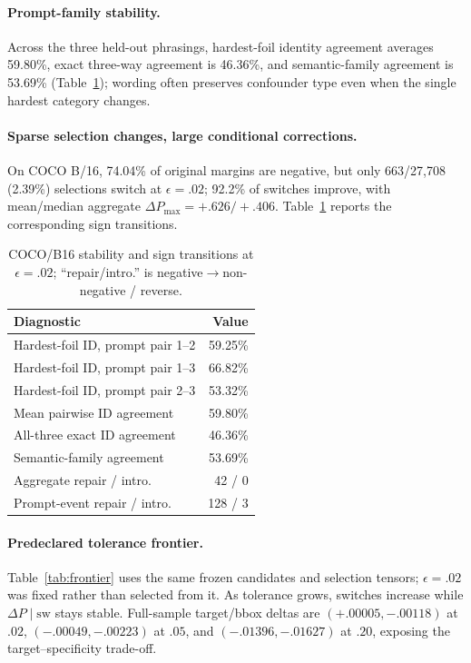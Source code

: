 \documentclass[10pt]{article}
\begin{document}
\paragraph{Prompt-family stability.}
Across the three held-out phrasings, hardest-foil identity agreement averages 59.80\%,
exact three-way agreement is 46.36\%, and semantic-family agreement is 53.69\%
(Table~\ref{tab:diagnostics}); wording often preserves confounder type even when
the single hardest category changes.

\paragraph{Sparse selection changes, large conditional corrections.}
On COCO B/16, 74.04\% of original margins are negative, but only 663/27,708
(2.39\%) selections switch at $\epsilon=.02$; 92.2\% of switches improve, with
mean/median aggregate $\Delta P_{\max}=+.626/+.406$. Table~\ref{tab:diagnostics}
reports the corresponding sign transitions.

\begin{table}[!h]
\centering
\caption{COCO/B16 stability and sign transitions at $\epsilon=.02$; ``repair/intro.'' is negative$\to$non-negative / reverse.}
\label{tab:diagnostics}
\small
\setlength{\tabcolsep}{3.0pt}
\renewcommand{\arraystretch}{0.94}
\begin{tabular}{lr}
\toprule
Diagnostic & Value\\
\midrule
Hardest-foil ID, prompt pair 1--2 & 59.25\%\\
Hardest-foil ID, prompt pair 1--3 & 66.82\%\\
Hardest-foil ID, prompt pair 2--3 & 53.32\%\\
Mean pairwise ID agreement & 59.80\%\\
All-three exact ID agreement & 46.36\%\\
Semantic-family agreement & 53.69\%\\
Aggregate repair / intro. & 42 / 0\\
Prompt-event repair / intro. & 128 / 3\\
\bottomrule
\end{tabular}
\end{table}

\paragraph{Predeclared tolerance frontier.}
Table~\ref{tab:frontier} uses the same frozen candidates and selection tensors;
$\epsilon=.02$ was fixed rather than selected from it. As tolerance grows, switches
increase while $\Delta P\mid\mathrm{sw}$ stays stable. Full-sample target/bbox deltas
are $(+.00005,-.00118)$ at $.02$, $(-.00049,-.00223)$ at $.05$, and
$(-.01396,-.01627)$ at $.20$, exposing the target--specificity trade-off.
\end{document}
